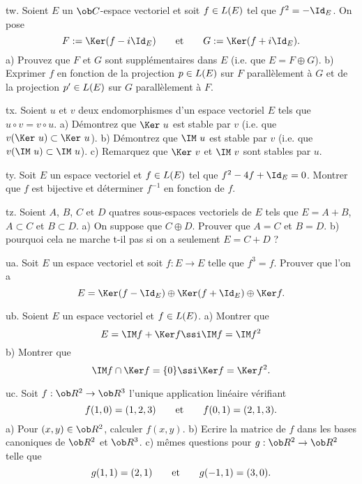 \exo [Level=1,Fight=1,Learn=1,Field=\EspacesVectoriels,Type=\Exercices,Origin=] tw. Soient $E$ un $\ob C$-espace vectoriel et soit $f\in\sc L(E)$ tel que $f^2=-\Id_E$. On pose
$$
F:=\Ker(f-i\Id_E)\qquad \hbox{et}\qquad G:=\Ker(f+i\Id_E). 
$$
a) Prouvez que $F$ et $G$ sont supplémentaires dans $E$ (i.e. que $E=F\oplus G$). \pn
b) Exprimer $f$ en fonction de la projection $p\in\sc L(E)$ sur $F$ parallèlement à $G$ et de la projection $p'\in\sc L(E)$ sur $G$ parallèlement à $F$. 

\exo [Level=1,Fight=0,Learn=0,Field=\EspacesVectoriels,Type=\Exercices,Origin=] tx. 
Soient $u$ et $v$ deux endomorphismes d'un espace vectoriel $E$ tels que $u\circ v=v\circ u$. \pn
a) Démontrez que $\Ker\  u$ est stable par $v$ (i.e. que $v(\Ker\  u)\subset \Ker\  u$). \pn
b) Démontrez que $\IM\  u$ est stable par $v$ (i.e. que $v(\IM\  u)\subset \IM\  u$). \pn
c) Remarquez que $\Ker\  v$ et $\IM\  v$ sont stables par $u$.  

\exo [Level=1,Fight=0,Learn=0,Field=\EspacesVectoriels,Type=\Exercices,Origin=] ty. 
Soit $E$ un espace vectoriel et $f\in\sc L(E)$ tel que $f^2-4f+\Id_E=0$. \pn
Montrer que $f$ est bijective et déterminer $f^{-1}$ en fonction de $f$. 

\exo [Level=1,Fight=1,Learn=1,Field=\FonctionsDéfiniesParUneIntégrale,Type=\Exercices,Origin=] tz. 
Soient $A$, $B$, $C$ et $D$ quatres sous-espaces vectoriels de $E$ tels que $E=A+B$, $A\subset C$ et $B\subset D$. \pn
a)  On suppose que $C\oplus D$. Prouver que $A=C$ et $B=D$. \pn
b) pourquoi cela ne marche t-il pas si on a seulement $E=C+D$ ? 

\exo [Level=1,Fight=1,Learn=1,Field=\EspacesVectoriels,Type=\Exercices,Origin=] ua. 
Soit $E$ un espace vectoriel et soit $f:E\to E$ telle que $f^3=f$. \pn Prouver que l'on a 
$$
E=\Ker(f-\Id_E)\oplus\Ker(f+\Id_E)\oplus\Ker f.
$$

\exo [Level=1,Fight=1,Learn=1,Field=\EspacesVectoriels,Type=\Exercices,Origin=] ub. 
Soient $E$ un espace vectoriel et $f\in\sc L(E)$. \pn
a) Montrer que 
$$
E=\IM f+\Ker f\ssi \IM f=\IM f^2
$$
b) Montrer que 
$$
\IM f\cap\Ker f=\{0\}\ssi \Ker f=\Ker f^2.
$$

\exo [Level=1,Fight=0,Learn=0,Field=\Matrices,Type=\Exercices,Origin=] uc. 
Soit $f:\ob R^2\to\ob R^3$ l'unique application linéaire vérifiant $$
f(1,0)=(1,2,3)\qquad \hbox{et}\qquad f(0,1)=(2,1,3).
$$
a) Pour $(x,y)\in \ob R^2$, calculer $f(x,y)$. \pn
b) Ecrire la matrice de $f$ dans les bases canoniques de $\ob R^2$ et $\ob R^3$. \pn
c) mêmes questions pour $g:\ob R^2\to\ob R^2$ telle que $$
g(1,1)=(2,1)\qquad\hbox{et}\qquad g(-1,1)=(3,0).
$$ 


